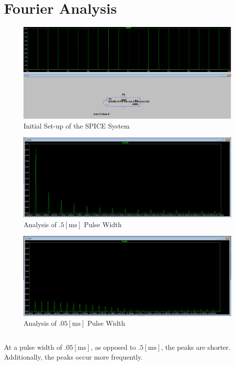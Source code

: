 \documentclass[
	letterpaper, %
	10pt, %
]{CSUniSchoolLabReport}
\begin{document}
\section{Fourier Analysis}

\begin{figure}[h!]
  \centering
  \includegraphics[width=.8\textwidth]{Figures/L4FA1.png}
  \caption{Initial Set-up of the SPICE System}
  \label{fig:1}
\end{figure}

\setcounter{subsection}{2}

\begin{figure}[h!]
  \centering
  \includegraphics[width=.8\textwidth]{Figures/L4FA2.png}
  \caption{Analysis of $.5[\si{\milli\second}]$ Pulse Width}
  \label{fig:2}
\end{figure}

\begin{figure}[h!]
  \centering
  \includegraphics[width=.8\textwidth]{Figures/L4FA3.png}
  \caption{Analysis of $.05[\si{\milli\second}]$ Pulse Width}
  \label{fig:3}
\end{figure}

\subsection{} At a pulse width of $.05[\si{\milli\second}]$, as opposed to $.5[\si{\milli\second}]$, the peaks are shorter. Additionally, the peaks occur more frequently.
\end{document}
